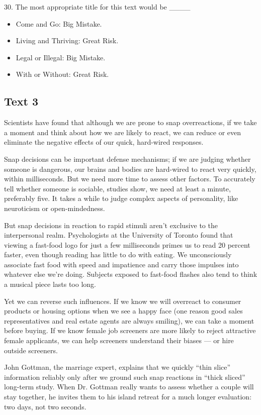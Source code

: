 \documentclass[UTF8,11pt]{ctexart}
\begin{document}
30. The most appropriate title for this text would be \_\_\_\_


\begin{itemize}[leftmargin=2em,itemsep=.2em,topsep=.4em]\item[A.] Come and Go: Big Mistake.
\item[B.] Living and Thriving: Great Risk.
\item[C.] Legal or Illegal: Big Mistake.
\item[D.] With or Without: Great Risk.
\end{itemize}

\subsection*{\textbf{Text 3}}


Scientists have found that although we are prone to snap overreactions, if we take a moment and think about how we are likely to react, we can reduce or even eliminate the negative effects of our quick, hard-wired responses.


Snap decisions can be important defense mechanisms; if we are judging whether someone is dangerous, our brains and bodies are hard-wired to react very quickly, within milliseconds. But we need more time to assess other factors. To accurately tell whether someone is sociable, studies show, we need at least a minute, preferably five. It takes a while to judge complex aspects of personality, like neuroticism or open-mindedness.


But snap decisions in reaction to rapid stimuli aren’t exclusive to the interpersonal realm. Psychologists at the University of Toronto found that viewing a fast-food logo for just a few milliseconds primes us to read 20 percent faster, even though reading has little to do with eating. We unconsciously associate fast food with speed and impatience and carry those impulses into whatever else we’re doing. Subjects exposed to fast-food flashes also tend to think a musical piece lasts too long.


Yet we can reverse such influences. If we know we will overreact to consumer products or housing options when we see a happy face (one reason good sales representatives and real estate agents are always smiling), we can take a moment before buying. If we know female job screeners are more likely to reject attractive female applicants, we can help screeners understand their biases — or hire outside screeners.


John Gottman, the marriage expert, explains that we quickly “thin slice” information reliably only after we ground such snap reactions in “thick sliced” long-term study. When Dr. Gottman really wants to assess whether a couple will stay together, he invites them to his island retreat for a much longer evaluation: two days, not two seconds.
\end{document}
